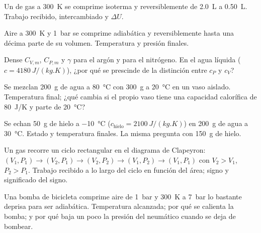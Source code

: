 \begin{exercise}[$\star$]\label{exo:b1:first-law:2}
Un  de gas a \qty{300}{K} se comprime isoterma y reversiblemente de
\qty{2.0}{L} a \qty{0.50}{L}. Trabajo recibido,  intercambiado y
$\Delta U$.
\end{exercise}

\begin{exercise}[$\star$]\label{exo:b1:first-law:3}
Aire a \qty{300}{K} y \qty{1}{bar} se comprime adiabática y reversiblemente
hasta una décima parte de su volumen. Temperatura y presión finales.
\end{exercise}

\begin{exercise}[$\star$]\label{exo:b1:first-law:4}
Dense $C_{V,m}$, $C_{P,m}$ y $\gamma$ para el argón y para el nitrógeno.
En el agua líquida ($c = \qty{4180}{J/(kg.K)}$), ¿por qué se prescinde de
la distinción entre $c_P$ y $c_V$?
\end{exercise}

\begin{exercise}[$\star\star$]\label{exo:b1:first-law:5}
Se mezclan \qty{200}{g} de agua a \qty{80}{\degreeCelsius} con \qty{300}{g}
a \qty{20}{\degreeCelsius} en un vaso aislado. Temperatura final; ¿qué
cambia si el propio vaso tiene una capacidad calorífica de \qty{80}{J/K} y
parte de \qty{20}{\degreeCelsius}?
\end{exercise}

\begin{exercise}[$\star\star$]\label{exo:b1:first-law:6}
Se echan \qty{50}{g} de hielo a \qty{-10}{\degreeCelsius} ($c_{\text{hielo}} = \qty{2100}{J/(kg.K)}$)
en \qty{200}{g} de agua a \qty{30}{\degreeCelsius}. Estado y temperatura
finales. La misma pregunta con \qty{150}{g} de hielo.
\end{exercise}

\begin{exercise}[$\star\star$]\label{exo:b1:first-law:7}
Un gas recorre un ciclo rectangular en el diagrama de Clapeyron: $(V_1, P_1)
\to (V_2, P_1) \to (V_2, P_2) \to (V_1, P_2) \to (V_1, P_1)$ con $V_2 > V_1$,
$P_2 > P_1$. Trabajo recibido a lo largo del ciclo en función del área;
signo y significado del signo.
\end{exercise}

\begin{exercise}[$\star\star$]\label{exo:b1:first-law:8}
Una bomba de bicicleta comprime aire de \qty{1}{bar} y \qty{300}{K} a
\qty{7}{bar} lo bastante deprisa para ser adiabática. Temperatura
alcanzada; por qué se calienta la bomba; y por qué baja un poco la presión
del neumático cuando se deja de bombear.
\end{exercise}

